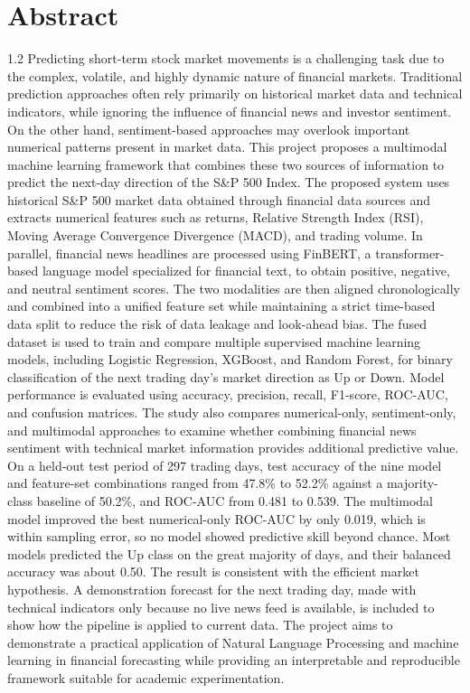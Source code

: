 \documentclass[12pt,a4paper]{report}
\begin{document}
\chapter*{Abstract}
\begin{spacing}{1.2}
Predicting short-term stock market movements is a challenging task due to the complex,
volatile, and highly dynamic nature of financial markets. Traditional prediction approaches often
rely primarily on historical market data and technical indicators, while ignoring the influence of
financial news and investor sentiment. On the other hand, sentiment-based approaches may
overlook important numerical patterns present in market data. This project proposes a
multimodal machine learning framework that combines these two sources of information to
predict the next-day direction of the S\&P 500 Index.
\newline
The proposed system uses historical S\&P 500 market data obtained through financial data
sources and extracts numerical features such as returns, Relative Strength Index (RSI), Moving
Average Convergence Divergence (MACD), and trading volume. In parallel, financial news
headlines are processed using FinBERT, a transformer-based language model specialized for
financial text, to obtain positive, negative, and neutral sentiment scores. The two modalities are
then aligned chronologically and combined into a unified feature set while maintaining a strict
time-based data split to reduce the risk of data leakage and look-ahead bias.
\newline
The fused dataset is used to train and compare multiple supervised machine learning
models, including Logistic Regression, XGBoost, and Random Forest, for binary classification
of the next trading day's market direction as Up or Down. Model performance is evaluated
using accuracy, precision, recall, F1-score, ROC-AUC, and confusion matrices. The study
also compares numerical-only, sentiment-only, and multimodal approaches to examine whether
combining financial news sentiment with technical market information provides additional
predictive value.
\newline
On a held-out test period of 297 trading days, test accuracy of the nine model and feature-set
combinations ranged from 47.8\% to 52.2\% against a majority-class baseline of 50.2\%, and
ROC-AUC from 0.481 to 0.539. The multimodal model improved the best numerical-only ROC-AUC
by only 0.019, which is within sampling error, so no model showed predictive skill beyond
chance. Most models predicted the Up class on the great majority of days, and their balanced
accuracy was about 0.50. The result is consistent with the efficient market hypothesis. A demonstration
forecast for the next trading day, made with technical indicators only because no live news feed is
available, is included to show how the pipeline is applied to current data.
\newline
The project aims to demonstrate a practical application of Natural Language Processing
and machine learning in financial forecasting while providing an interpretable and reproducible
framework suitable for academic experimentation.
\end{spacing}
\clearpage
\end{document}
